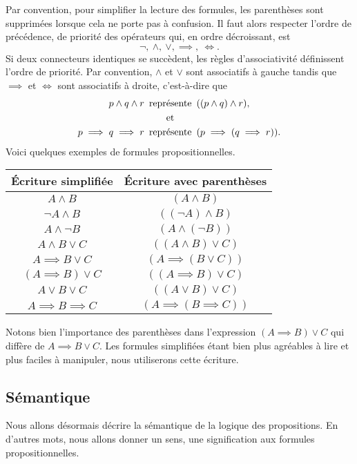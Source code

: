 Par convention, pour simplifier la lecture des formules, les parenthèses sont supprimées lorsque cela ne porte pas à confusion. Il faut alors respecter l'ordre de précédence, de priorité des opérateurs qui, en ordre décroissant, est 
\begin{equation*}
\neg,\ \land, \ \lor, \implies,\ \Leftrightarrow. 
\end{equation*} 
Si deux connecteurs identiques se succèdent, les règles d'associativité définissent l'ordre de priorité. Par convention, $\land$ et $\lor$ sont associatifs à gauche tandis que $\implies$ et $\Leftrightarrow$ sont associatifs à droite, c'est-à-dire que 
\begin{align*}
p\land q \land r \enskip \text{repré}&\text{sente} \enskip ((p\land q)\land r), \\
\text{e}&\text{t} \\
p\implies q\implies r \enskip\text{repré}&\text{sente} \enskip (p\implies(q\implies r)).
\end{align*} 
Voici quelques exemples de formules propositionnelles.
\begin{center}
\begin{tabular}{|c||c|}
\hline
Écriture simplifiée & Écriture avec parenthèses \\
\hline \hline
$A\land B$ & $(A\land B)$ \\ \hline
$\neg A\land B$ & $((\neg A)\land B)$ \\ \hline
$A \land \neg B$ & $(A\land (\neg B))$ \\ \hline
$A\land B \lor C$ & $((A\land B)\lor C)$ \\ \hline
$A \implies B \lor C$ & $(A \implies (B\lor C))$ \\ \hline
$(A\implies B)\lor C$ & $((A\implies B)\lor C)$ \\ \hline
$A \lor B \lor C$ & $((A \lor B) \lor C)$ \\ \hline
$A\implies B \implies C$ & $(A\implies(B\implies C))$ \\ \hline
\end{tabular}
\end{center}
Notons bien l'importance des parenthèses dans l'expression $(A\implies B)\lor C$ qui diffère de $A\implies B \lor C$. Les formules simplifiées étant bien plus agréables à lire et plus faciles à manipuler, nous utiliserons cette écriture.

\subsection{Sémantique}
Nous allons désormais décrire la sémantique de la logique des propositions. En d'autres mots, nous allons donner un sens, une signification aux formules propositionnelles. 
\smallskip

